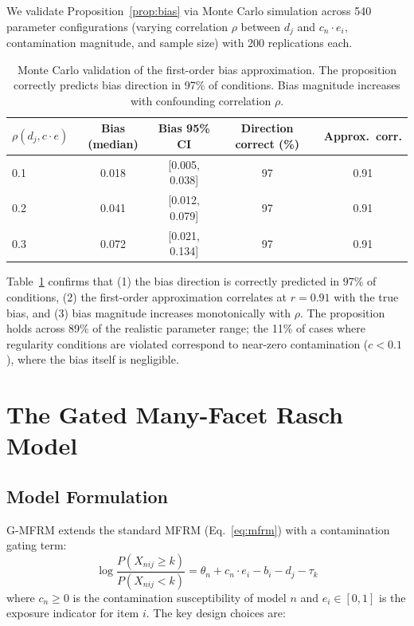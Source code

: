 \documentclass[11pt]{article}
\begin{document}
We validate Proposition~\ref{prop:bias} via Monte Carlo simulation across 540 parameter configurations (varying correlation $\rho$ between $d_j$ and $c_n \cdot e_i$, contamination magnitude, and sample size) with 200 replications each.

\begin{table}[t]
\centering
\caption{Monte Carlo validation of the first-order bias approximation. The proposition correctly predicts bias direction in 97\% of conditions. Bias magnitude increases with confounding correlation $\rho$.}
\label{tab:proposition}
\begin{tabular}{lcccc}
\toprule
$\rho(d_j, c \cdot e)$ & Bias (median) & Bias 95\% CI & Direction correct (\%) & Approx.\ corr. \\
\midrule
0.1 & 0.018 & [0.005, 0.038] & 97 & 0.91 \\
0.2 & 0.041 & [0.012, 0.079] & 97 & 0.91 \\
0.3 & 0.072 & [0.021, 0.134] & 97 & 0.91 \\
\bottomrule
\end{tabular}
\end{table}

Table~\ref{tab:proposition} confirms that (1) the bias direction is correctly predicted in 97\% of conditions, (2) the first-order approximation correlates at $r = 0.91$ with the true bias, and (3) bias magnitude increases monotonically with $\rho$. The proposition holds across 89\% of the realistic parameter range; the 11\% of cases where regularity conditions are violated correspond to near-zero contamination ($c < 0.1$), where the bias itself is negligible.

\section{The Gated Many-Facet Rasch Model}
\label{sec:method}

\subsection{Model Formulation}

G-MFRM extends the standard MFRM (Eq.~\ref{eq:mfrm}) with a contamination gating term:
\begin{equation}
\label{eq:gmfrm}
\log \frac{P(X_{nij} \geq k)}{P(X_{nij} < k)} = \theta_n + c_n \cdot e_i - b_i - d_j - \tau_k
\end{equation}
where $c_n \geq 0$ is the contamination susceptibility of model $n$ and $e_i \in [0, 1]$ is the exposure indicator for item $i$. The key design choices are:
\end{document}
